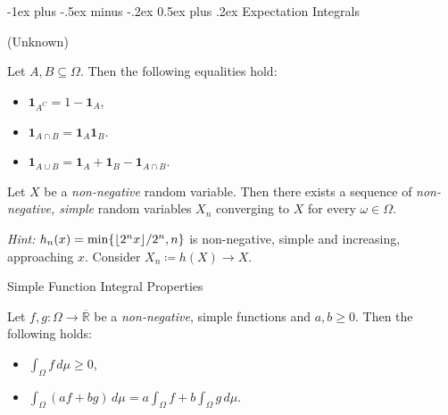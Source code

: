 \documentclass[10pt,landscape]{article}
\makeatletter
\renewcommand{\geq}{\geqslant}
\newcommand{\Hint}{\textit{Hint: }}
\newcommand{\Indicator}[1]{\mathbf{1}_{#1}}
\DeclarePairedDelimiter\floor{\lfloor}{\rfloor}
\renewcommand{\section}{\@startsection{section}{1}{0mm}%
                                {-1ex plus -.5ex minus -.2ex}%
                                {0.5ex plus .2ex}%
                                {\normalfont\large\bfseries}}
\makeatother
\begin{document}
\begin{multicols}{3}

\section{Expectation Integrals}

\begin{proposition}{(Unknown)}{}

    Let $A,B \subseteq \Omega$. Then the following equalities hold:

        \begin{itemize}
            \setlength{\parskip}{0em}
            \item $\Indicator{A^C} = 1 - \Indicator{A}$,
            \item $\Indicator{A \cap B} = \Indicator{A}\Indicator{B}$.
            \item $\Indicator{A \cup B} = \Indicator{A} + \Indicator{B} - \Indicator{A \cap B}$.
        \end{itemize}

\end{proposition}

\begin{lemma}{3.3}{}

    Let $X$ be a \emph{non-negative} random variable. Then there exists a sequence of \emph{non-negative, simple} random variables $X_n$ converging to $X$ for every $\omega \in \Omega$.

    \Hint $h_n(x)=\min\{\floor{2^nx}/2^n, n\}$ is non-negative, simple and increasing, approaching $x$. Consider $X_n \coloneqq h(X) \to X$.

\end{lemma}

\begin{lemma}{}{Simple Function Integral Properties}

    Let $f,g: \Omega \to \overline{\mathbb{R}}$ be a \emph{non-negative}, simple functions and $a,b \geq 0$. Then the following holds:

    \begin{itemize}
        \item $\int_{\Omega} f \, d\mu \geq 0$,
        \item $\int_{\Omega} (af + bg) \, d\mu = a\int_{\Omega} f + b\int_{\Omega}g \, d\mu$.
    \end{itemize}

\end{lemma}


\end{multicols}
\end{document}

